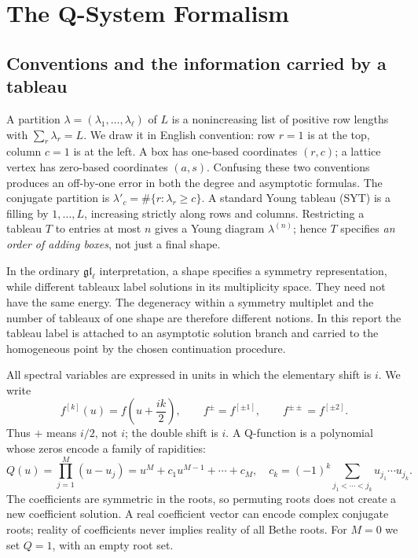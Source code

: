 \documentclass[11pt]{article}
\begin{document}
\section{The Q-System Formalism}
\label{sec:qsystem}

\subsection{Conventions and the information carried by a tableau}

A partition $\lambda=(\lambda_1,\ldots,\lambda_\ell)$ of $L$ is a
nonincreasing list of positive row lengths with $\sum_r\lambda_r=L$.
We draw it in English convention: row $r=1$ is at the top, column $c=1$
is at the left. A box has one-based coordinates $(r,c)$; a lattice
vertex has zero-based coordinates $(a,s)$. Confusing these two conventions
produces an off-by-one error in both the degree and asymptotic formulas.
The conjugate partition is $\lambda'_c=\#\{r:\lambda_r\ge c\}$.
A standard Young tableau (SYT) is a filling by $1,\ldots,L$, increasing
strictly along rows and columns. Restricting a tableau $T$ to entries
at most $n$ gives a Young diagram $\lambda^{(n)}$; hence $T$ specifies
\emph{an order of adding boxes}, not just a final shape.

In the ordinary $\mathfrak{gl}_\ell$ interpretation, a shape specifies a
symmetry representation, while different tableaux label solutions in its
multiplicity space. They need not have the same energy. The degeneracy
within a symmetry multiplet and the number of tableaux of one shape are
therefore different notions. In this report the tableau label is attached
to an asymptotic solution branch and carried to the homogeneous point by
the chosen continuation procedure.

All spectral variables are expressed in units in which the elementary
shift is $i$. We write
\[
 f^{[k]}(u)=f\left(u+\frac{ik}{2}\right),\qquad
 f^\pm=f^{[\pm1]},\qquad f^{\pm\pm}=f^{[\pm2]}.
\]
Thus $+$ means $i/2$, not $i$; the double shift is $i$.
A Q-function is a polynomial whose zeros encode a family of rapidities:
\begin{equation}
 \label{eq:q-vieta}
 Q(u)=\prod_{j=1}^{M}(u-u_j)
 =u^M+c_1u^{M-1}+\cdots+c_M,\quad
 c_k=(-1)^k\!\sum_{j_1<\cdots<j_k}u_{j_1}\cdots u_{j_k}.
\end{equation}
The coefficients are symmetric in the roots, so permuting roots does not
create a new coefficient solution. A real coefficient vector can encode
complex conjugate roots; reality of coefficients never implies reality
of all Bethe roots. For $M=0$ we set $Q=1$, with an empty root set.
\end{document}
